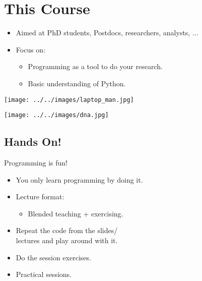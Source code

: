 \documentclass[aspectratio=1610,slidestop]{beamer}
\begin{document}
\section{This Course}
\begin{pframe}
 \begin{itemize}
  \item Aimed at PhD students, Postdocs, researchers, analysts, ...
  \item Focus on:
  \begin{itemize}
   \item Programming as a tool to do your research.
   \item Basic understanding of Python.
  \end{itemize}
 \end{itemize}
 \medskip

 \begin{minipage}{0.47\textwidth}
 \begin{center}
   \texttt{[image: ../../images/laptop\_man.jpg]}
 \end{center}
 \end{minipage}%
 \begin{minipage}{0.47\textwidth}
 \begin{center}
   \texttt{[image: ../../images/dna.jpg]}
 \end{center}
 \end{minipage}
\end{pframe}

\subsection{Hands On!}
\begin{pframe}
 Programming is fun!
 \begin{itemize}
  \item You only learn programming by doing it.
  \item Lecture format:
  \begin{itemize}
   \item Blended teaching + exercising.
  \end{itemize}
  \item Repeat the code from the slides/ \\
  lectures and play around with it.
  \item Do the session exercises.
  \item Practical sessions.
 \end{itemize}
\end{pframe}
\end{document}
